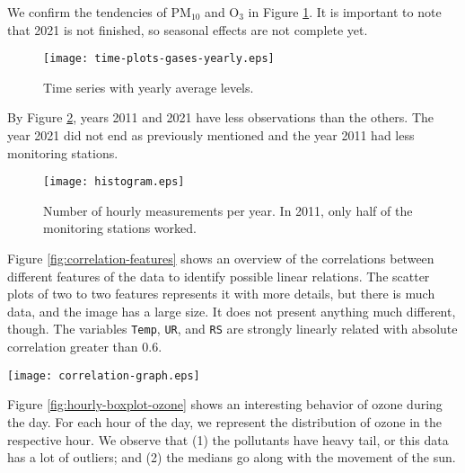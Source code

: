 We confirm the tendencies of PM$_{10}$ and O$_3$ in Figure \ref{fig:time-series-gases-year}. It is important to note that
2021 is not finished, so seasonal effects are not complete yet.

\begin{figure}[!ht]
    \centering
    \texttt{[image: time-plots-gases-yearly.eps]}
    \caption{Time series with yearly average levels.}
    \label{fig:time-series-gases-year}
\end{figure}

By Figure \ref{fig:histogram-obs-years}, years 2011 and 2021 have less
observations than the others. The year 2021 did not end as previously
mentioned and the year 2011 had less monitoring stations.  

\begin{figure}
    \begin{center}
        \texttt{[image: histogram.eps]}
    \end{center}
    \caption{Number of hourly measurements per year. In 2011, only half of the monitoring stations worked.}
    \label{fig:histogram-obs-years}
\end{figure}

Figure \ref{fig:correlation-features} shows an overview of the correlations
between different features of the data to identify possible linear relations.
The scatter plots of two to two features represents it with more details, but
there is much data, and the image has a large size. It does not present anything
much different, though. The variables {\tt Temp}, {\tt UR}, and {\tt RS} are
strongly linearly related with absolute correlation greater than 0.6.

\begin{figure*}[t]
    \begin{center}
        \texttt{[image: correlation-graph.eps]}
    \end{center}
    \caption{Correlation heat map comparing the data features.}
    \label{fig:correlation-features}
\end{figure*}

Figure \ref{fig:hourly-boxplot-ozone} shows an interesting behavior of ozone during the day. For each hour of the day, we represent the distribution of ozone in the respective hour. We
observe that (1) the pollutants have heavy tail, or this data has a lot of
outliers; and (2) the medians go along with the movement of the sun.

\vspace{-0.5cm}

